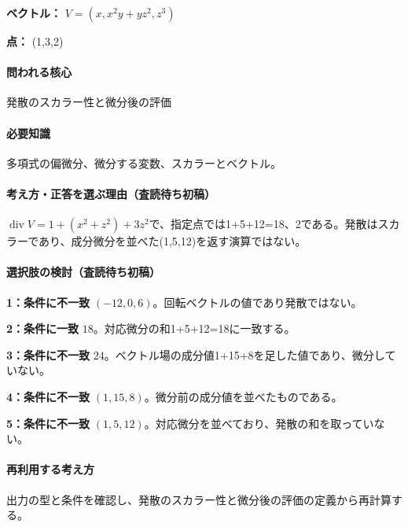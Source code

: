 \noindent\textbf{ベクトル：} \(V=(x,x^2y+yz^2,z^3)\)\par

\noindent\textbf{点：} (1,3,2)\par

\paragraph{問われる核心} 発散のスカラー性と微分後の評価

\paragraph{必要知識} 多項式の偏微分、微分する変数、スカラーとベクトル。

\paragraph{考え方・正答を選ぶ理由（査読待ち初稿）} \(\operatorname{div}V=1+(x^2+z^2)+3z^2\)で、指定点では1+5+12=\allowbreak{}18、2である。発散はスカラーであり、成分微分を並べた(1,5,12)を返す演算ではない。

\paragraph{選択肢の検討（査読待ち初稿）}\mbox{}\par

\noindent\textbf{1：条件に不一致} \((-12,0,6)\)。回転ベクトルの値であり発散ではない。\par

\noindent\textbf{2：条件に一致} \(18\)。対応微分の和1+5+12=\allowbreak{}18に一致する。\par

\noindent\textbf{3：条件に不一致} \(24\)。ベクトル場の成分値1+15+8を足した値であり、微分していない。\par

\noindent\textbf{4：条件に不一致} \((1,15,8)\)。微分前の成分値を並べたものである。\par

\noindent\textbf{5：条件に不一致} \((1,5,12)\)。対応微分を並べており、発散の和を取っていない。\par

\paragraph{再利用する考え方} 出力の型と条件を確認し、発散のスカラー性と微分後の評価の定義から再計算する。

